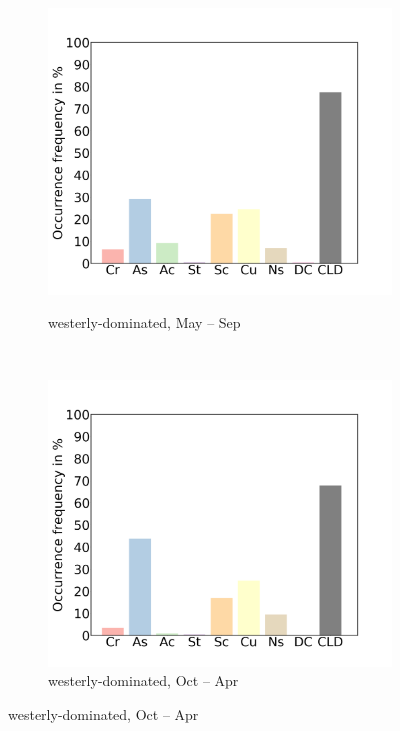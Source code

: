 \documentclass[alpha-refs]{wiley-article}
\begin{document}
 \begin{figure}\ContinuedFloat   
        \begin{subfigure}[b]{0.5\textwidth}
        \centering
        \caption{westerly-dominated, May -- Sep }        
        \includegraphics[width=\textwidth]{cld_type_freq_westerlydomain_monsoonseason.png}
        \label{fig:cld_type7}
        \end{subfigure}
        ~ 
        \begin{subfigure}[b]{0.5\textwidth}
        \centering
        \caption{westerly-dominated, Oct -- Apr }        
        \includegraphics[width=\textwidth]{cld_type_freq_westerlydomain_westerlyseason.png}

\end{subfigure}
\end{figure}
\end{document}
